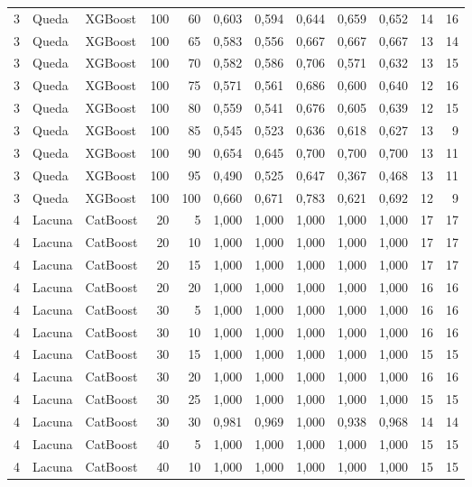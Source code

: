 \begin{longtable}{@{}rllrrrrrrrrr@{}}
3 & Queda & XGBoost & 100 & 60 & 0,603 & 0,594 & 0,644 & 0,659 & 0,652 & 14 & 16 \\
3 & Queda & XGBoost & 100 & 65 & 0,583 & 0,556 & 0,667 & 0,667 & 0,667 & 13 & 14 \\
3 & Queda & XGBoost & 100 & 70 & 0,582 & 0,586 & 0,706 & 0,571 & 0,632 & 13 & 15 \\
3 & Queda & XGBoost & 100 & 75 & 0,571 & 0,561 & 0,686 & 0,600 & 0,640 & 12 & 16 \\
3 & Queda & XGBoost & 100 & 80 & 0,559 & 0,541 & 0,676 & 0,605 & 0,639 & 12 & 15 \\
3 & Queda & XGBoost & 100 & 85 & 0,545 & 0,523 & 0,636 & 0,618 & 0,627 & 13 & 9 \\
3 & Queda & XGBoost & 100 & 90 & 0,654 & 0,645 & 0,700 & 0,700 & 0,700 & 13 & 11 \\
3 & Queda & XGBoost & 100 & 95 & 0,490 & 0,525 & 0,647 & 0,367 & 0,468 & 13 & 11 \\
3 & Queda & XGBoost & 100 & 100 & 0,660 & 0,671 & 0,783 & 0,621 & 0,692 & 12 & 9 \\
4 & Lacuna & CatBoost & 20 & 5 & 1,000 & 1,000 & 1,000 & 1,000 & 1,000 & 17 & 17 \\
4 & Lacuna & CatBoost & 20 & 10 & 1,000 & 1,000 & 1,000 & 1,000 & 1,000 & 17 & 17 \\
4 & Lacuna & CatBoost & 20 & 15 & 1,000 & 1,000 & 1,000 & 1,000 & 1,000 & 17 & 17 \\
4 & Lacuna & CatBoost & 20 & 20 & 1,000 & 1,000 & 1,000 & 1,000 & 1,000 & 16 & 16 \\
4 & Lacuna & CatBoost & 30 & 5 & 1,000 & 1,000 & 1,000 & 1,000 & 1,000 & 16 & 16 \\
4 & Lacuna & CatBoost & 30 & 10 & 1,000 & 1,000 & 1,000 & 1,000 & 1,000 & 16 & 16 \\
4 & Lacuna & CatBoost & 30 & 15 & 1,000 & 1,000 & 1,000 & 1,000 & 1,000 & 15 & 15 \\
4 & Lacuna & CatBoost & 30 & 20 & 1,000 & 1,000 & 1,000 & 1,000 & 1,000 & 16 & 16 \\
4 & Lacuna & CatBoost & 30 & 25 & 1,000 & 1,000 & 1,000 & 1,000 & 1,000 & 15 & 15 \\
4 & Lacuna & CatBoost & 30 & 30 & 0,981 & 0,969 & 1,000 & 0,938 & 0,968 & 14 & 14 \\
4 & Lacuna & CatBoost & 40 & 5 & 1,000 & 1,000 & 1,000 & 1,000 & 1,000 & 15 & 15 \\
4 & Lacuna & CatBoost & 40 & 10 & 1,000 & 1,000 & 1,000 & 1,000 & 1,000 & 15 & 15 \\

\end{longtable}
